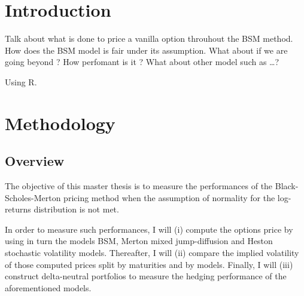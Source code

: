 \documentclass[12pt]{report}
\begin{document}

\tableofcontents{}



%
%
\chapter*{Introduction}
\label{cha:Introduction}

Talk about what is done to price a vanilla option throuhout the BSM method.
How does the BSM model is fair under its assumption. What about if we are going beyond ?
How perfomant is it ? 
What about other model such as \ldots ?

Using R. \cite{R}
%
%
\chapter{Methodology}
\label{cha:Methodology}


\section{Overview}
\label{sec:methodology:overview}

The objective of this master thesis is to measure the performances of the Black-Scholes-Merton pricing method when the assumption of normality for the log-returns distribution is not met.

In order to measure such performances, I will (i) compute the options price by using in turn the models BSM, Merton mixed jump-diffusion and Heston stochastic volatility models. 
Thereafter, I will (ii) compare the implied volatility of those computed prices split by maturities and by models.
Finally, I will (iii) construct delta-neutral portfolios to measure the hedging performance of the aforementioned models.
\end{document}
